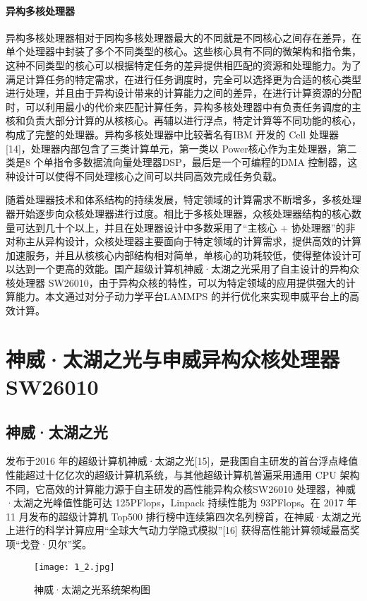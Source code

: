 \paragraph{异构多核处理器}
异构多核处理器相对于同构多核处理器最大的不同就是不同核心之间存在差异，在单个处理器中封装了多个不同类型的核心。这些核心具有不同的微架构和指令集，这种不同类型的核心可以根据特定任务的差异提供相匹配的资源和处理能力。为了满足计算任务的特定需求，在进行任务调度时，完全可以选择更为合适的核心类型进行处理，并且由于异构设计带来的计算能力之间的差异，在进行计算资源的分配时，可以利用最小的代价来匹配计算任务，异构多核处理器中有负责任务调度的主核和负责大部分计算的从核核心。再辅以进行浮点，特定计算等不同功能的核心，构成了完整的处理器。异构多核处理器中比较著名有IBM 开发的 Cell 处理器[14]，处理器内部包含了三类计算单元，第一类以 Power核心作为主处理器，第二类是8 个单指令多数据流向量处理器DSP，最后是一个可编程的DMA 控制器，这种设计可以使得不同处理核心之间可以共同高效完成任务负载。

随着处理器技术和体系结构的持续发展，特定领域的计算需求不断增多，多核处理器开始逐步向众核处理器进行过度。相比于多核处理器，众核处理器结构的核心数量可达到几十个以上，并且在处理器设计中多数采用了“主核心 + 协处理器”的非对称主从异构设计，众核处理器主要面向于特定领域的计算需求，提供高效的计算加速服务，并且从核核心内部结构相对简单，单核心的功耗较低，使得整体设计可以达到一个更高的效能。国产超级计算机神威·太湖之光采用了自主设计的异构众核处理器 SW26010，由于异构众核的特性，可以为特定领域的应用提供强大的计算能力。本文通过对分子动力学平台LAMMPS 的并行优化来实现申威平台上的高效计算。
\section{神威·太湖之光与申威异构众核处理器 SW26010}
\subsection{神威·太湖之光}
发布于2016 年的超级计算机神威·太湖之光[15]，是我国自主研发的首台浮点峰值性能超过十亿亿次的超级计算机系统，与其他超级计算机普遍采用通用 CPU 架构不同，它高效的计算能力源于自主研发的高性能异构众核SW26010 处理器，神威·太湖之光峰值性能可达 125PFlops，Linpack 持续性能为 93PFlops。在 2017 年 11 月发布的超级计算机 Top500 排行榜中连续第四次名列榜首，在神威·太湖之光上进行的科学计算应用“全球大气动力学隐式模拟”[16] 获得高性能计算领域最高奖项“戈登·贝尔”奖。

 \begin{figure}[h]
  \centering
  \texttt{[image: 1\_2.jpg]}
  \caption{神威·太湖之光系统架构图}
  \label{fig:badge}
\end{figure}

